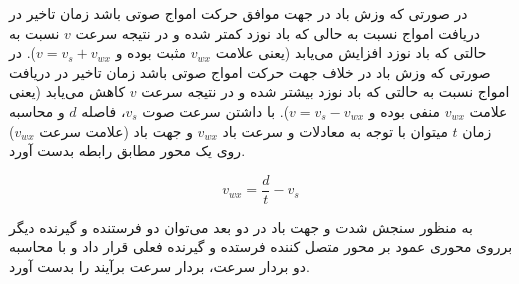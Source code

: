 در صورتی که وزش باد در جهت موافق حرکت امواج صوتی باشد زمان تاخیر در دریافت امواج نسبت به حالی که باد نوزد کمتر شده و در نتیجه سرعت $v$ نسبت به حالتی که باد نوزد افزایش می‌یابد (یعنی علامت $v_{wx}$ مثبت بوده و $v = v_s+v_{wx}$). در صورتی که وزش باد در خلاف جهت حرکت امواج صوتی باشد زمان تاخیر در دریافت امواج نسبت به حالتی که باد نوزد بیشتر شده و در نتیجه سرعت $v$ کاهش می‌یابد (یعنی علامت $v_{wx}$ منفی بوده و $v = v_s-v_{wx}$). با داشتن سرعت صوت $v_s$، فاصله $d$ و محاسبه زمان $t$ میتوان با توجه به معادلات  و  سرعت باد $v_{wx}$ و جهت باد (علامت سرعت $v_{wx}$) روی یک محور مطابق رابطه  بدست آورد. 

\begin{equation}\label{eq:speedWindX}
	v_{wx} = \frac{d}{t} - v_s
\end{equation}

به منظور سنجش شدت و جهت باد در دو بعد می‌توان دو فرستنده و گیرنده دیگر برروی محوری عمود بر محور متصل کننده فرستده و گیرنده فعلی قرار داد و با محاسبه دو بردار سرعت، بردار سرعت برآیند را بدست آورد.

